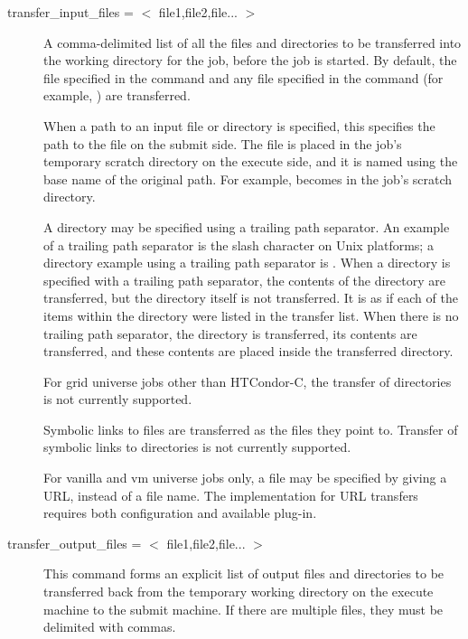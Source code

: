 \begin{description}

\item[transfer\_input\_files = $<$ file1,file2,file... $>$]
\label{man-condor-submit-transfer-input-files}
A comma-delimited list of all the files and directories to be transferred
into the working directory for the job, before the job is started.
By default, the file specified in the
 command and any file specified in the 
command (for example, ) are transferred.

When a path to an input file or directory is specified, this specifies
the path to the file on the submit side.
The file is placed in the job's temporary scratch directory on the execute side,
and it is named using the base name of the original path.  For
example,  becomes  in the job's
scratch directory.

A directory may be specified using a trailing path separator.
An example of a trailing path separator is the slash character on Unix
platforms; a directory example using a trailing path separator
is . 
When a directory is specified with a trailing path separator,
the contents of the directory are
transferred,  but the directory itself is not transferred.
It is as if each of the items
within the directory were listed in the transfer list.
When there is no trailing path separator,
the directory is transferred, its contents are transferred,
and these contents are placed inside the transferred directory.

For grid universe jobs other than HTCondor-C, the transfer of
directories is not currently supported.

Symbolic links to files are transferred as the files they point to.
Transfer of symbolic links to directories is not currently supported.

For vanilla and vm universe jobs only,
a file may be specified by giving a URL, instead of a file name.
The implementation for URL transfers requires both configuration
and available plug-in. 
 

\label{man-condor-submit-transfer-output-files}
\item[transfer\_output\_files = $<$ file1,file2,file... $>$]
This command forms an explicit list of output files and directories 
to be transferred
back from the temporary working directory on the execute machine to
the submit machine.
If there are multiple files, they must be delimited with commas.


\end{description}
